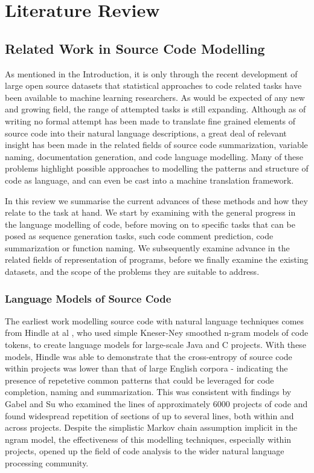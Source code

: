 \chapter{Literature Review}
\section{Related Work in Source Code Modelling}

As mentioned in the Introduction, it is only through the recent development of large open source datasets that statistical approaches to code related tasks have been available to machine learning researchers. 
As would be expected of any new and growing field, the range of attempted tasks is still expanding. 
Although as of writing no formal attempt has been made to translate fine grained elements of source code into their natural language descriptions, a great deal of relevant insight has been made in the related fields of source code summarization, variable naming, documentation generation, and code language modelling. Many of these problems highlight possible approaches to modelling the patterns and structure of code as language, and can even be cast into a machine translation framework.  

In this review we summarise the current advances of these methods and how they relate to the task at hand.  We start by examining with the general progress in the language modelling of code, before moving on to specific tasks that can be posed as sequence generation tasks, such code comment prediction, code summarization or function naming. We subsequently examine advance in the related fields of representation of programs, before we finally examine the existing datasets, and the scope of the problems they are suitable to address. 

\subsection{Language Models of Source Code}

The earliest work modelling source code with natural language techniques comes from Hindle at al \cite{hindle_naturalness_nodate}, who used simple Kneser-Ney smoothed n-gram models of code tokens, to create language models for large-scale Java and C projects.
With these models, Hindle was able to demonstrate that the cross-entropy of source code within projects was lower than that of large English corpora - indicating the presence of repetetive common patterns that could be leveraged for code completion, naming and summarization.
This was consistent with findings by Gabel and Su \cite{gabel_study_2010} who examined the lines of approximately 6000 projects of code and found widespread repetition of sections of up to several lines, both within and across projects.
Despite the simplistic Markov chain assumption implicit in the ngram model, the effectiveness of this modelling techniques, especially within projects, opened up the field of code analysis to the wider natural language processing community.


